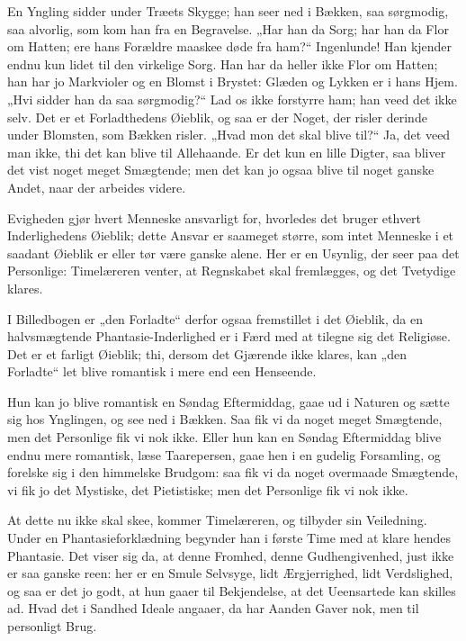 \documentclass[12pt,a4paper]{book}
\newcommand{\apage}[1]{\marginnote{\footnotesize\textit{[#1]}}}
\begin{document}
En Yngling sidder under Træets Skygge; han seer ned i Bækken, saa
sørgmodig, saa alvorlig, som kom han fra en Begravelse. „Har han da Sorg;
har han da Flor om Hatten; ere hans Forældre maaskee døde fra ham?“
Ingenlunde! Han kjender endnu kun lidet til den virkelige Sorg. Han har
da heller ikke Flor om Hatten; han har jo Markvioler og en Blomst i
Brystet: Glæden og Lykken er i hans Hjem. „Hvi sidder han da saa
sørgmodig?“ Lad os ikke forstyrre ham; han veed det ikke selv. Det er et
Forladthedens Øieblik, og saa er der Noget, der risler derinde under
Blomsten, som Bækken risler. „Hvad mon det skal blive til?“ Ja, det veed
man ikke, thi det kan blive til Allehaande. Er det kun en lille Digter,
saa bliver det vist noget meget Smægtende; men det kan jo ogsaa blive til
noget ganske Andet, naar der arbeides videre.

Evigheden gjør hvert Menneske ansvarligt for, hvorledes det bruger
ethvert Inderlighedens Øieblik; dette Ansvar er saameget større, som
intet Menneske i et saadant Øieblik er eller tør være ganske alene. Her
er en Usynlig, der seer paa det Personlige: Timelæreren venter, at
Regnskabet skal fremlægges, og det Tvetydige klares.

I Billedbogen er „den Forladte“ derfor ogsaa fremstillet i det Øieblik,
da en halvsmægtende Phantasie-Inderlighed er i Færd med at tilegne sig
det Religiøse. Det er et farligt Øieblik; thi, dersom det Gjærende ikke
klares, kan „den Forladte“ let blive romantisk i mere end een Henseende.

Hun kan jo blive romantisk en Søndag Eftermiddag, gaae ud i Naturen og
sætte sig hos Ynglingen, og see ned i Bækken. Saa fik vi da noget meget
Smægtende, men det Personlige fik vi nok ikke. Eller hun kan en Søndag
Eftermiddag blive endnu mere romantisk, læse Taarepersen, gaae hen i en
gudelig Forsamling, og forelske sig i den himmelske Brudgom: saa fik vi
da noget overmaade Smægtende, vi fik jo det Mystiske, det Pietistiske;
men det Personlige fik vi nok ikke.
 \apage{125}

At dette nu ikke skal skee, kommer Timelæreren, og tilbyder sin
Veiledning. Under en Phantasieforklædning begynder han i første Time med
at klare hendes Phantasie. Det viser sig da, at denne Fromhed, denne
Gudhengivenhed, just ikke er saa ganske reen: her er en Smule Selvsyge,
lidt Ærgjerrighed, lidt Verdslighed, og saa er det jo godt, at hun gaaer
til Bekjendelse, at det Ueensartede kan skilles ad. Hvad det i Sandhed
Ideale angaaer, da har Aanden Gaver nok, men til personligt Brug.
\end{document}
